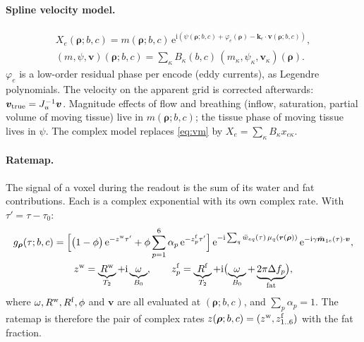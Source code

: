 \documentclass[11pt]{article}
\theoremstyle{remark}
\newcommand{\rr}{\bm r}
\newcommand{\pp}{\bm\rho}
\newcommand{\vv}{\bm v}
\newcommand{\ii}{\mathrm i}
\newcommand{\ee}{\mathrm e}
\begin{document}
\paragraph{Spline velocity model.}
\begin{equation}
\begin{gathered}
X_e(\pp;b,c)=m(\pp;b,c)\,\ee^{\ii(\psi(\pp;b,c)+\varphi_e(\pp)-\bm k_e\cdot\vv(\pp;b,c))},\\
(m,\psi,\vv)(\pp;b,c)=\sum_\kappa B_\kappa(b,c)\,(m_\kappa,\psi_\kappa,\vv_\kappa)(\pp).
\end{gathered}
\label{eq:vm}
\end{equation}
$\varphi_e$ is a low-order residual phase per encode (eddy currents), as Legendre polynomials. The velocity on the apparent grid is corrected afterwards: $\vv_{\rm true}=J_u^{-1}\vv$.
Magnitude effects of flow and breathing (inflow, saturation, partial volume of moving tissue) live in $m(\pp;b,c)$; the tissue phase of moving tissue lives in $\psi$. The complex model replaces \cref{eq:vm} by $X_e=\sum_\kappa B_\kappa x_{e\kappa}$.

\paragraph{Ratemap.} The signal of a voxel during the readout is the sum of its water and fat contributions. Each is a complex exponential with its own complex rate. With $\tau'=\tau-\tau_0$:
\begin{equation}
\begin{gathered}
g_{\pp}(\tau;b,c)=\Bigl[\bigl(1-\phi\bigr)\,\ee^{-z^{\rm w}\tau'}+\phi\sum_{p=1}^{6}\alpha_p\,\ee^{-z^{\rm f}_p\tau'}\Bigr]\,
\ee^{-\ii\sum_q\bar w_{eq}(\tau)\,\mu_q(\rr(\pp))}\,\ee^{-\ii\gamma\bar{\bm m}_{1e}(\tau)\cdot\vv},\\
z^{\rm w}=\underbrace{R^{\rm w}}_{T_2}+\ii\underbrace{\omega}_{B_0},\qquad
z^{\rm f}_p=\underbrace{R^{\rm f}}_{T_2}+\ii\bigl(\underbrace{\omega}_{B_0}+\underbrace{2\pi\Delta f_p}_{\text{fat}}\bigr),
\end{gathered}
\label{eq:ratemap}
\end{equation}
where $\omega,R^{\rm w},R^{\rm f},\phi$ and $\vv$ are all evaluated at $(\pp;b,c)$, and $\sum_p\alpha_p=1$. The ratemap is therefore the pair of complex rates $z(\pp;b,c)=(z^{\rm w},z^{\rm f}_{1..6})$ with the fat fraction.
\end{document}
